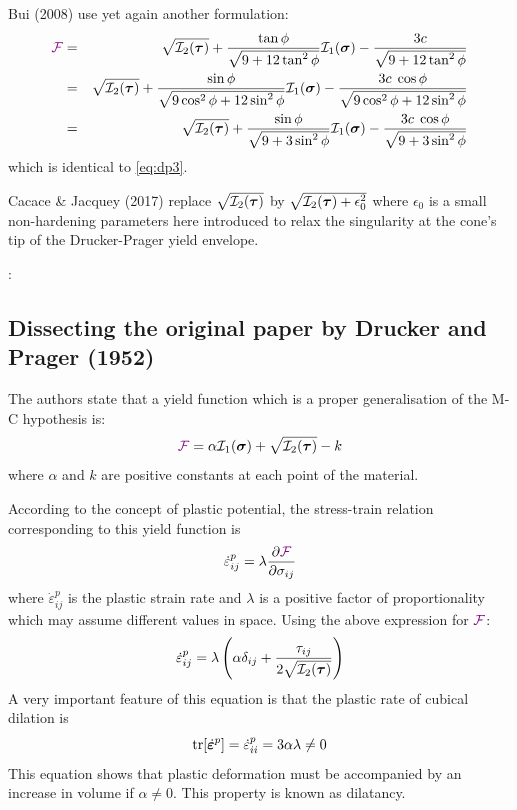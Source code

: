 \begin{remark}
Bui \etal (2008) \cite{bufs08} use yet again another formulation:
\begin{eqnarray}
{\color{violet}\cal F} 
&=& \sqrt{{\cal I}_2({\bm \tau})} + \frac{\tan \phi}{\sqrt{9 + 12 \tan^2 \phi}} {\cal I}_1({\bm \sigma})
- \frac{3 c}{\sqrt{9 + 12 \tan^2 \phi}} \nonumber\\
&=& \sqrt{{\cal I}_2({\bm \tau})} + \frac{\sin \phi}{\sqrt{9\cos^2 \phi + 12 \sin^2 \phi}} {\cal I}_1({\bm \sigma}) - \frac{3 c \; \cos\phi}{\sqrt{9\cos^2\phi + 12 \sin^2 \phi}} \nonumber\\
&=& \sqrt{{\cal I}_2({\bm \tau})} + \frac{\sin \phi}{\sqrt{9 + 3 \sin^2 \phi}} {\cal I}_1({\bm \sigma}) - \frac{3 c \; \cos\phi}{\sqrt{9 + 3\sin^2 \phi}} \nonumber
\end{eqnarray}
which is identical to \eqref{eq:dp3}.
\end{remark}

\begin{remark}
Cacace \& Jacquey (2017) \cite{caja17} replace $\sqrt{{\cal I}_2({\bm \tau})}$ by 
$\sqrt{{\cal I}_2({\bm \tau})+\epsilon_0^2}$ where $\epsilon_0$ is a small non-hardening parameters 
here introduced to relax the singularity at the cone's tip of the Drucker-Prager yield envelope.
\end{remark}

\Literature:


\subsection{Dissecting the original paper by Drucker and Prager (1952)}

The authors state that a yield function which is a proper generalisation of the M-C hypothesis is:
\[
{\color{violet}\cal F} = \alpha {\cal I}_1(\bm\sigma) + \sqrt{{\cal I}_2(\bm\tau)} - k
\]
where $\alpha$ and $k$ are positive constants at each point of the material.

According to the concept of plastic potential, the stress-train relation
corresponding to this yield function is 
\[
\dot\varepsilon_{ij}^{p} = \lambda \frac{\partial {\color{violet}\cal F}}{\partial \sigma_{ij}}
\]
where $\dot\varepsilon_{ij}^{p}$ is the plastic strain rate and $\lambda$
is a positive factor of proportionality which may assume different values in space. Using the above expression for ${\color{violet}\cal F}$:
\begin{equation}
\dot\varepsilon_{ij}^{p} = \lambda \left( \alpha \delta_{ij} + \frac{\tau_{ij}}{2\sqrt{{\cal I}_2(\bm\tau)}} \right)
\label{eq:dp52:ab}
\end{equation}
A very important feature of this equation is that the plastic rate of cubical
dilation is 
\begin{equation}
{\rm tr}[\dot{\bm \varepsilon}^{p}]
=\dot\varepsilon_{ii}^{p} = 3 \alpha \lambda \ne 0
\label{eq:dp52:bc}
\end{equation}
This equation shows that plastic deformation must be accompanied by an increase
in volume if $\alpha\ne 0$. This property is known as dilatancy.

